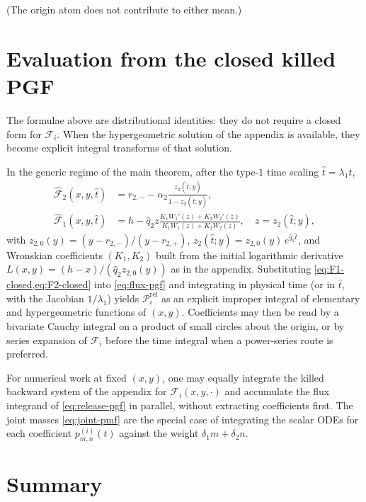 \documentclass[11pt]{article}
\theoremstyle{plain}
\theoremstyle{definition}
\theoremstyle{remark}
\begin{document}
(The origin atom does not contribute to either mean.)

\section{Evaluation from the closed killed PGF}

The formulae above are distributional identities: they do not require a closed form for
$\mathcal F_i$. When the hypergeometric solution of the appendix is available, they become
explicit integral transforms of that solution.

In the generic regime of the main theorem, after the type-$1$ time scaling
$\hat t=\lambda_1 t$,
\begin{align}
\widehat{\mathcal F}_2(x,y,\hat t)
&=
r_{2,-}-\alpha_2
\frac{z_2(\hat t;y)}{1-z_2(\hat t;y)},
\label{eq:F2-closed}
\\
\widehat{\mathcal F}_1(x,y,\hat t)
&=
h-\hat q_2 z
\frac{K_1W_1'(z)+K_2W_2'(z)}
{K_1W_1(z)+K_2W_2(z)},
\quad
z=z_2(\hat t;y),
\label{eq:F1-closed}
\end{align}
with $z_{2,0}(y)=(y-r_{2,-})/(y-r_{2,+})$,
$z_2(\hat t;y)=z_{2,0}(y)\,e^{\hat q_2\hat t}$,
and Wronskian coefficients $(K_1,K_2)$ built from the initial logarithmic derivative
$L(x,y)=(h-x)/(\hat q_2 z_{2,0}(y))$ as in the appendix.
Substituting \cref{eq:F1-closed,eq:F2-closed} into \cref{eq:flux-pgf} and integrating in physical
time (or in $\hat t$, with the Jacobian $1/\lambda_1$) yields
$\mathcal P_i^{\mathrm{rel}}$ as an explicit improper integral of elementary and hypergeometric
functions of $(x,y)$. Coefficients may then be read by a bivariate Cauchy integral on a product
of small circles about the origin, or by series expansion of $\mathcal F_i$ before the time
integral when a power-series route is preferred.

For numerical work at fixed $(x,y)$, one may equally integrate the killed backward system of the
appendix for $\mathcal F_i(x,y,\cdot)$ and accumulate the flux integrand of \cref{eq:release-pgf}
in parallel, without extracting coefficients first. The joint masses
\cref{eq:joint-pmf} are the special case of integrating the scalar ODEs for each coefficient
$p_{m,n}^{(i)}(t)$ against the weight $\delta_1m+\delta_2n$.

\section{Summary}
\end{document}
